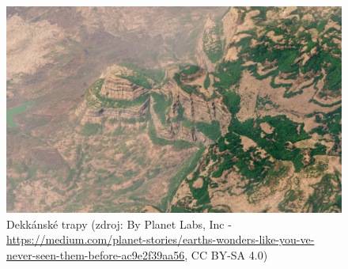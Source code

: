\begin{figure}[h]
	\centering
	\includegraphics[width=\linewidth]{obrazky/sopky/trapy}
	\caption{Dekkánské trapy (zdroj: By Planet Labs, Inc - \url{https://medium.com/planet-stories/earths-wonders-like-you-ve-never-seen-them-before-ac9e2f39aa56}, CC BY-SA 4.0)}
	\label{fig:trapy}
\end{figure}
